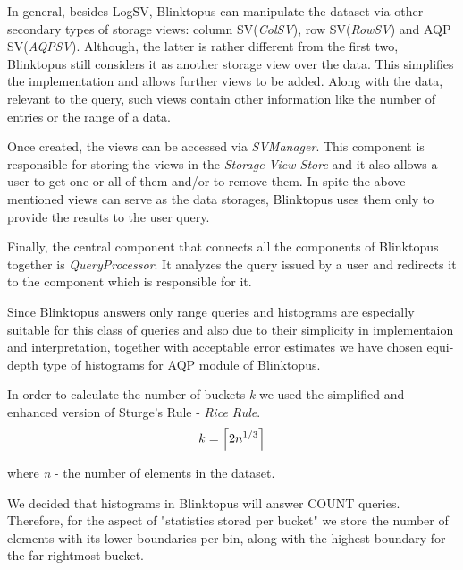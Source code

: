 \documentclass[10pt, conference, compsocconf]{IEEEtran}
\DeclarePairedDelimiter\ceil{\lceil}{\rceil}
\begin{document}
In general, besides LogSV, Blinktopus can manipulate the dataset via other secondary types of storage views: column SV(\textit{ColSV}), row SV(\textit{RowSV}) and AQP SV(\textit{AQPSV}). Although, the latter is rather different from the first two, Blinktopus still considers it as another storage view over the data. This simplifies the implementation and allows further views to be added. Along with the data, relevant to the query, such views contain other information like the number of entries or the range of a data. 

Once created, the views can be accessed via \textit{SVManager}. This component is responsible for storing the views in the \textit{Storage View Store} and it also allows a user to get one or all of them and/or to remove them.
In spite the above-mentioned views can serve as the data storages, Blinktopus uses them only to provide the results to the user query. 

Finally, the central component that connects all the components of Blinktopus together is \textit{QueryProcessor}. It analyzes the query issued by a user and redirects it to the component which is responsible for it.

Since Blinktopus answers only range queries and histograms are especially suitable for this class of queries and also due to their simplicity in implementaion and interpretation, together with acceptable error estimates we have chosen equi-depth type of histograms for AQP module of Blinktopus. 

In order to calculate the number of buckets \textit{k} we used the simplified and enhanced version of Sturge's Rule - \textit{Rice Rule}.
\begin{equation}
k=\ceil*{2n^{1/3}}
\end{equation}

where \textit{n} - the number of elements in the dataset.
 
We decided that histograms in Blinktopus will answer COUNT queries. Therefore, for the aspect of "statistics stored per bucket" we store the number of elements with its lower boundaries per bin, along with the highest boundary for the far rightmost bucket.
\end{document}
